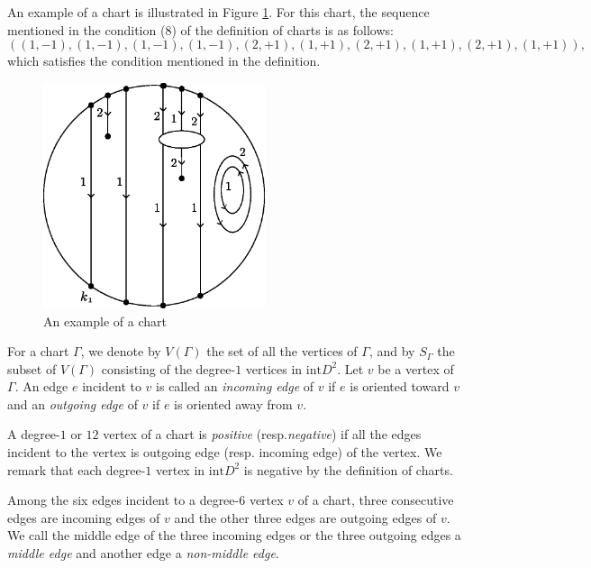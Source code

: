 \documentclass{amsart}
\theoremstyle{plain}
\theoremstyle{definition}
\begin{document}
An example of a chart is illustrated in Figure \ref{charts}. 
For this chart, the sequence mentioned in the condition (8) of the definition of charts is as follows: 
\[
((1,-1),(1,-1),(1,-1),(1,-1),(2,+1),(1,+1),(2,+1),(1,+1),(2,+1),(1,+1)), 
\]
which satisfies the condition mentioned in the definition. 

\begin{figure}[htbp]
\begin{center}
\includegraphics[width=65mm]{charts.eps}
\end{center}
\caption{An example of a chart}
\label{charts}
\end{figure}

For a chart $\Gamma$, we denote by $V(\Gamma)$ the set of all the vertices of $\Gamma$, 
and by $S_\Gamma$ the subset of $V(\Gamma)$ consisting of the degree-$1$ vertices in $\text{int}D^2$. 
Let $v$ be a vertex of $\Gamma$. 
An edge $e$ incident to $v$ is called an {\it incoming edge} of $v$ if $e$ is oriented toward $v$ and an {\it outgoing edge} of $v$ if $e$ is oriented away from $v$. 

\par

A degree-$1$ or $12$ vertex of a chart is {\it positive} (resp.{\it negative}) if all the edges incident to the vertex is outgoing edge (resp. incoming edge) of the vertex. 
We remark that each degree-$1$ vertex in $\text{int}D^2$ is negative by the definition of charts. 

\par

Among the six edges incident to a degree-$6$ vertex $v$ of a chart, three consecutive edges are incoming edges of $v$ and the other three edges are outgoing edges of $v$. 
We call the middle edge of the three incoming edges or the three outgoing edges a {\it middle edge} and another edge a {\it non-middle edge}. 
\end{document}
